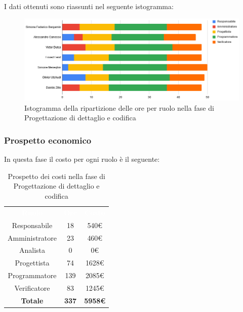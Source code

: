 I dati ottenuti sono riassunti nel seguente istogramma:
\begin{figure}[H]
\centering
\includegraphics[scale=0.60]{img/grafici/tabella_fase_prog_cod.png}
\caption{Istogramma della ripartizione delle ore per ruolo nella fase di Progettazione di dettaglio e codifica}
\end{figure}
 
\subsubsection{Prospetto economico}
In questa fase il costo per ogni ruolo è il seguente:
 
\begin{table}[H]
\centering\renewcommand{\arraystretch}{1.5}
\caption{Prospetto dei costi nella fase di Progettazione di dettaglio e codifica}
\vspace{0.2cm}
\begin{tabular}{ c c c }
\rowcolor{redafk}
\textcolor{white}{\textbf{Ruolo}} & \textcolor{white}{\textbf{Ore}} &
\textcolor{white}{\textbf{Costo}}  \\
Responsabile & 18 & 540€ \\
Amministratore & 23 & 460€ \\
Analista & 0 & 0€ \\
Progettista & 74 & 1628€ \\
Programmatore & 139 & 2085€  \\
Verificatore & 83 & 1245€  \\
\rowcolor{lastrowcolor}
\textbf{Totale} & \textbf{337} & \textbf{5958€}  \\
\end{tabular}
\end{table}
 

